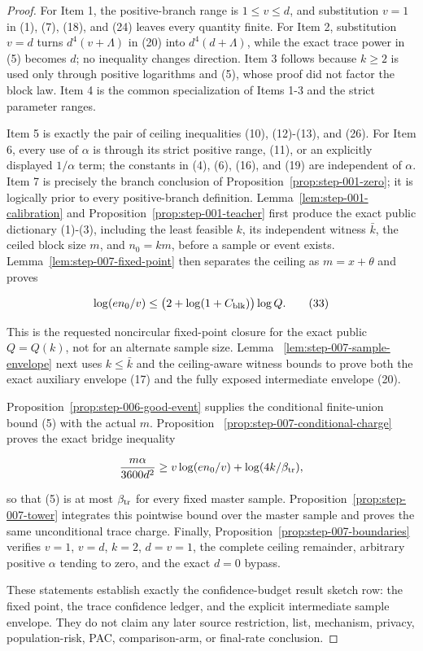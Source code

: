 \begin{proof}
For Item 1, the  positive-branch range is
\(1\le v\le d\), and substitution \(v=1\) in (1), (7), (18), and (24)
leaves every quantity finite. For Item 2, substitution \(v=d\) turns
\(d^4(v+\Lambda)\) in (20) into \(d^4(d+\Lambda)\), while the exact trace
power in (5) becomes \(d\); no inequality changes direction. Item 3 follows
because \(k\ge2\) is used only through positive logarithms and 
(5), whose proof did not factor the block law. Item 4 is the common
specialization of Items 1-3 and the strict parameter ranges.

Item 5 is exactly the pair of ceiling inequalities (10), (12)-(13), and
(26). For Item 6, every use of \(\alpha\) is through its strict positive
range, (11), or an explicitly displayed \(1/\alpha\) term; the constants in
(4), (6), (16), and (19) are independent of \(\alpha\). Item 7 is precisely
the branch conclusion of Proposition~\ref{prop:step-001-zero}; it is logically prior to every
positive-branch definition. 
Lemma~\ref{lem:step-001-calibration} and Proposition~\ref{prop:step-001-teacher} first produce the exact public
dictionary (1)-(3), including the least feasible \(k\), its independent
witness \(\bar k\), the ceiled block size \(m\), and \(n_0=km\), before a
sample or event exists. Lemma~\ref{lem:step-007-fixed-point} then separates
the ceiling as \(m=x+\theta\) and proves

\[
 \log(en_0/v)
 \le\bigl(2+\log(1+C_{\rm blk})\bigr)\log Q.
\tag{33}
\]

This is the requested noncircular fixed-point closure for the exact public
\(Q=Q(k)\), not for an alternate sample size. Lemma
~\ref{lem:step-007-sample-envelope} next uses \(k\le\bar k\) and the
 ceiling-aware witness bounds to prove both the exact auxiliary
envelope (17) and the fully exposed intermediate envelope (20).

Proposition~\ref{prop:step-006-good-event} supplies the conditional
finite-union bound (5) with the actual \(m\). Proposition
~\ref{prop:step-007-conditional-charge} proves the exact bridge inequality

\[
 \frac{m\alpha}{3600d^2}
 \ge v\log(en_0/v)+\log(4k/\beta_{\rm tr}),
\]

so that (5) is at most \(\beta_{\rm tr}\) for every fixed master sample.
Proposition~\ref{prop:step-007-tower} integrates this pointwise bound over
the master sample and proves the same unconditional trace charge. Finally,
Proposition~\ref{prop:step-007-boundaries} verifies \(v=1\), \(v=d\),
\(k=2\), \(d=v=1\), the complete ceiling remainder, arbitrary positive
\(\alpha\) tending to zero, and the exact \(d=0\) bypass.

These statements establish exactly the confidence-budget result sketch row: the fixed point,
the trace confidence ledger, and the explicit intermediate sample envelope.
They do not claim any later source restriction, list, mechanism, privacy,
population-risk, PAC, comparison-arm, or final-rate conclusion.



\end{proof}

